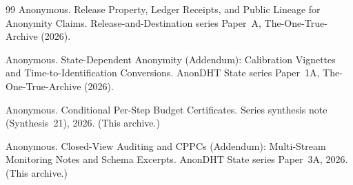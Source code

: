 \documentclass[11pt]{article}
\begin{document}
\begin{thebibliography}{99}
Anonymous.
\newblock Release Property, Ledger Receipts, and Public Lineage for Anonymity Claims.
\newblock Release-and-Destination series Paper~A, The-One-True-Archive (2026).

Anonymous.
\newblock State-Dependent Anonymity (Addendum): Calibration Vignettes and Time-to-Identification Conversions.
\newblock AnonDHT State series Paper~1A, The-One-True-Archive (2026).


Anonymous.
\newblock Conditional Per-Step Budget Certificates.
\newblock Series synthesis note (Synthesis~21), 2026. (This archive.)



Anonymous.
\newblock Closed-View Auditing and CPPCs (Addendum): Multi-Stream Monitoring Notes and Schema Excerpts.
\newblock AnonDHT State series Paper~3A, 2026. (This archive.)

\end{thebibliography}
\end{document}
